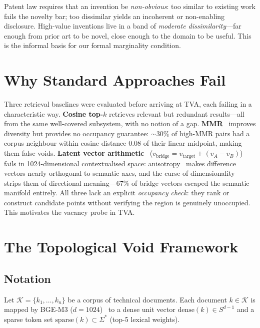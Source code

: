 \documentclass[11pt,twocolumn]{article}
\newcommand{\vtarget}{v_{\mathrm{target}}}
\begin{document}
Patent law requires that an invention be \emph{non-obvious}: too
similar to existing work fails the novelty bar; too dissimilar yields
an incoherent or non-enabling disclosure.  High-value inventions live
in a band of \emph{moderate dissimilarity}---far enough from prior art
to be novel, close enough to the domain to be useful.  This is the
informal basis for our formal marginality condition.

\section{Why Standard Approaches Fail}
\label{sec:motivation}

Three retrieval baselines were evaluated before arriving at TVA, each
failing in a characteristic way.
\textbf{Cosine top-$k$} retrieves relevant but redundant results---all
from the same well-covered subsystem, with no notion of a gap.
\textbf{MMR}~\cite{carbonell1998mmr} improves diversity but provides
no occupancy guarantee: $\sim$30\% of high-MMR pairs had a corpus
neighbour within cosine distance 0.08 of their linear midpoint,
making them false voids.
\textbf{Latent vector arithmetic}~\cite{mikolov2013linguistic}
($v_{\mathrm{bridge}} = \vtarget + (v_A - v_B)$) fails in
1024-dimensional contextualised space: anisotropy~\cite{ethayarajh2019anisotropy}
makes difference vectors nearly orthogonal to semantic axes, and the
curse of dimensionality~\cite{beyer1999nearest} strips them of
directional meaning---67\% of bridge vectors escaped the semantic
manifold entirely.
All three lack an explicit \emph{occupancy check}: they rank or
construct candidate points without verifying the region is genuinely
unoccupied.  This motivates the vacancy probe in TVA.

\section{The Topological Void Framework}
\label{sec:framework}

\subsection{Notation}

Let $\mathcal{K} = \{k_1, \ldots, k_n\}$ be a corpus of technical
documents.  Each document $k \in \mathcal{K}$ is mapped by BGE-M3
($d=1024$)~\cite{chen2024bge} to a dense unit vector
$\mathrm{dense}(k) \in S^{d-1}$ and a sparse token set
$\mathrm{sparse}(k) \subset \Sigma^*$ (top-5 lexical weights).
\end{document}
